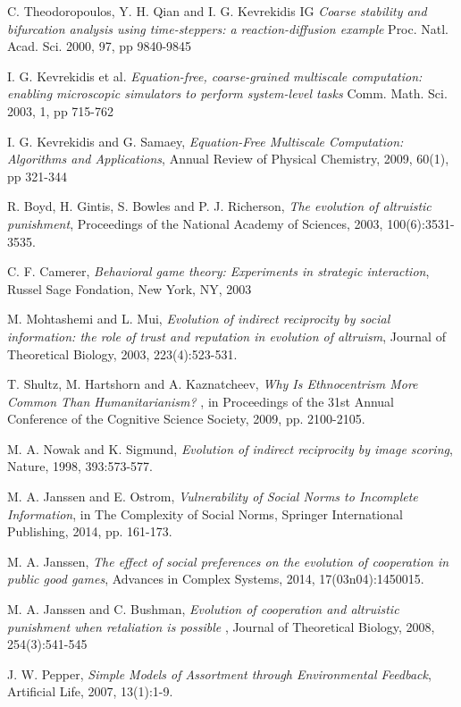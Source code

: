 \documentclass[11pt]{article}
\begin{document}
\begin{thebibliography}{10}
{\sc C. Theodoropoulos, Y. H. Qian and I. G. Kevrekidis IG}
{\it Coarse stability and bifurcation analysis using time-steppers: a reaction-diffusion example}
Proc. Natl. Acad. Sci. 2000, 97, pp 9840-9845

{\sc I. G. Kevrekidis et al.} 
{\it Equation-free, coarse-grained multiscale computation: enabling microscopic simulators to perform system-level tasks}
Comm. Math. Sci. 2003, 1, pp 715-762 

{\sc I. G. Kevrekidis and G. Samaey},
{\it Equation-Free Multiscale Computation: Algorithms and Applications},
Annual Review of Physical Chemistry, 2009, 60(1), pp 321-344

  {\sc R. Boyd, H. Gintis, S. Bowles and P. J. Richerson},
  {\it The evolution of altruistic punishment},
  Proceedings of the National Academy of Sciences, 2003, 100(6):3531-3535.
  
  {\sc C. F. Camerer},
  {\it Behavioral game theory: Experiments in strategic interaction},
  Russel Sage Fondation, New York, NY, 2003
  
  {\sc M. Mohtashemi and L. Mui},
  {\it Evolution of indirect reciprocity by social information: the role of trust and reputation in evolution of altruism},
  Journal of Theoretical Biology, 2003, 223(4):523-531.   
    
  {\sc T. Shultz, M. Hartshorn and A. Kaznatcheev},
  {\it Why Is Ethnocentrism More Common Than Humanitarianism? },
  in Proceedings of the 31st Annual Conference of the Cognitive Science Society, 2009, pp. 2100-2105.
  
  {\sc M. A. Nowak and K. Sigmund},
  {\it Evolution of indirect reciprocity by image scoring},
  Nature, 1998, 393:573-577.
   
  {\sc M. A. Janssen and E. Ostrom},
  {\it Vulnerability of Social Norms to Incomplete Information},
  in The Complexity of Social Norms, Springer International Publishing, 2014, pp. 161-173.
  
  {\sc M. A. Janssen},
  {\it The effect of social preferences on the evolution of cooperation in public good games},
  Advances in Complex Systems, 2014, 17(03n04):1450015.
   
  {\sc M. A. Janssen and C. Bushman},
  {\it Evolution of cooperation and altruistic punishment when retaliation is possible }, 
  Journal of Theoretical Biology, 2008, 254(3):541-545
 
  {\sc J. W. Pepper},
  {\it Simple Models of Assortment through Environmental Feedback},
  Artificial Life, 2007, 13(1):1-9.


\end{thebibliography} 
\end{document}
